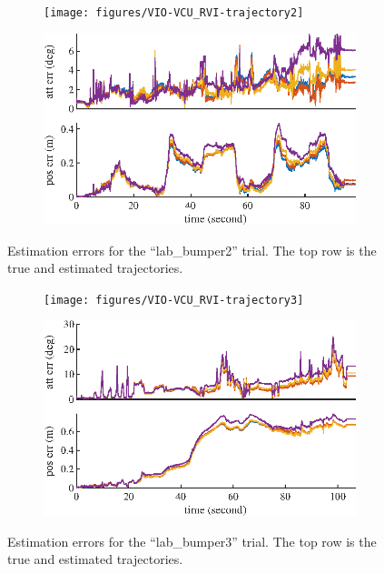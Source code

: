 \begin{figure}
	\centering
	\begin{subfigure}{\textwidth}
		\centering
		\texttt{[image: figures/VIO-VCU\_RVI-trajectory2]}
	\end{subfigure}
	\begin{subfigure}{\textwidth}
		\centering
		\vspace{1cm}
		\includegraphics[scale=1.3]{figures/VIO-VCU_RVI-error2}
	\end{subfigure}
	\caption[Estimation errors for the ``lab\_bumper2'' trial.]{Estimation errors for the ``lab\_bumper2'' trial. The top row is the true and estimated trajectories.}
	\label{fig:VIO-dataset2}
\end{figure}

\begin{figure}
	\centering
	\begin{subfigure}{\textwidth}
		\centering
		\texttt{[image: figures/VIO-VCU\_RVI-trajectory3]}
	\end{subfigure}
	\begin{subfigure}{\textwidth}
		\centering
		\vspace{1cm}
		\includegraphics[scale=1.3]{figures/VIO-VCU_RVI-error3}
	\end{subfigure}
	\caption[Estimation errors for the ``lab\_bumper3'' trial.]{Estimation errors for the ``lab\_bumper3'' trial. The top row is the true and estimated trajectories.}
	\label{fig:VIO-dataset3}
\end{figure}

